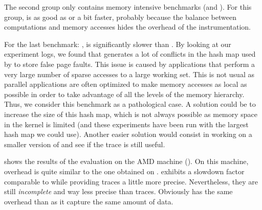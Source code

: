 The second group only contains memory intensive benchmarks (\FT and
\IS). For this group, \Moca is as good as \TABARNAC or a bit faster, probably
because the balance between computations and memory accesses hides the
overhead of the instrumentation.

For the last benchmark: \MG, \Moca is significantly slower than \TABARNAC.
By looking at our
experiment logs, we found that \MG generates a lot of conflicts in the hash map used by
\Moca to store false page faults. This issue is caused by applications that perform a very large number of sparse accesses to a large working set.
This is not usual as parallel applications are often optimized to make memory accesses as local as possible in order to take advantage of all the levels of the
memory hierarchy.
Thus, we consider this benchmark as a pathological case.
A solution could be to increase the size of
this hash map, which is not always possible as memory space in the kernel is
limited (and these experiments have been run with the largest hash map we could use). Another easier solution would consist in working on a smaller version
of \MG and see if the trace is still useful.

 shows the results of the evaluation on the AMD machine
(\Stremi). On this machine, \Moca overhead is quite similar to the one
obtained on \Edel.
\MemProf exhibits a slowdown factor comparable to \Mitos while
providing traces a little more precise. Nevertheless, they are still \emph{incomplete} and
way less precise than \Moca traces. Obviously \MemProfTun has the same
overhead than \MemProf as it capture the same amount of data.

